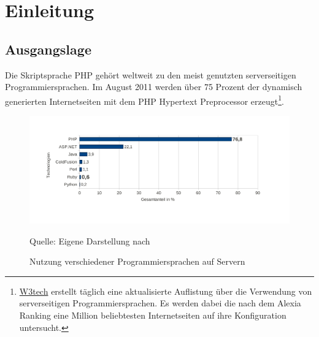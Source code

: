 %
%

\chapter{Einleitung}

\section{Ausgangslage}




Die Skriptsprache PHP gehört weltweit zu den meist genutzten serverseitigen Programmiersprachen. Im August 2011 werden über 75 Prozent der dynamisch generierten Internetseiten mit dem PHP Hypertext Preprocessor erzeugt\footnote{\href{http://w3techs.com/}{W3tech} erstellt täglich eine aktualisierte Auflistung über die Verwendung von serverseitigen Programmiersprachen. Es werden dabei die nach dem Alexia Ranking eine Million beliebtesten Internetseiten auf ihre Konfiguration untersucht.}.

\begin{figure}[!ht]
\begin{center}
\label{fig.programmingusage}
\includegraphics[scale=0.6]{images/Einleitung/serverseitigeScriptsprachen.pdf}
\caption[Nutzung verschiedener Programmiersprachen auf Servern]{Nutzung verschiedener Programmiersprachen auf Servern}{Quelle: Eigene Darstellung nach \citep{w3techs}}
\end{center}
\end{figure}

